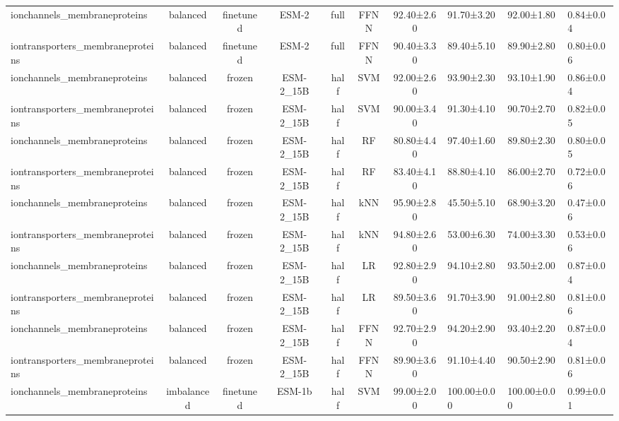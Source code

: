 \begin{tabular}{lcccccc}
    ionchannels\_membraneproteins &   balanced &      finetuned &        ESM-2 &      full &       FFNN &  92.40±2.60 &  91.70±3.20 &  92.00±1.80 & 0.84±0.04 \\
iontransporters\_membraneproteins &   balanced &      finetuned &        ESM-2 &      full &       FFNN &  90.40±3.30 &  89.40±5.10 &  89.90±2.80 & 0.80±0.06 \\
    ionchannels\_membraneproteins &   balanced &         frozen &    ESM-2\_15B &      half &        SVM &  92.00±2.60 &  93.90±2.30 &  93.10±1.90 & 0.86±0.04 \\
iontransporters\_membraneproteins &   balanced &         frozen &    ESM-2\_15B &      half &        SVM &  90.00±3.40 &  91.30±4.10 &  90.70±2.70 & 0.82±0.05 \\
    ionchannels\_membraneproteins &   balanced &         frozen &    ESM-2\_15B &      half &         RF &  80.80±4.40 &  97.40±1.60 &  89.80±2.30 & 0.80±0.05 \\
iontransporters\_membraneproteins &   balanced &         frozen &    ESM-2\_15B &      half &         RF &  83.40±4.10 &  88.80±4.10 &  86.00±2.70 & 0.72±0.06 \\
    ionchannels\_membraneproteins &   balanced &         frozen &    ESM-2\_15B &      half &        kNN &  95.90±2.80 &  45.50±5.10 &  68.90±3.20 & 0.47±0.06 \\
iontransporters\_membraneproteins &   balanced &         frozen &    ESM-2\_15B &      half &        kNN &  94.80±2.60 &  53.00±6.30 &  74.00±3.30 & 0.53±0.06 \\
    ionchannels\_membraneproteins &   balanced &         frozen &    ESM-2\_15B &      half &         LR &  92.80±2.90 &  94.10±2.80 &  93.50±2.00 & 0.87±0.04 \\
iontransporters\_membraneproteins &   balanced &         frozen &    ESM-2\_15B &      half &         LR &  89.50±3.60 &  91.70±3.90 &  91.00±2.80 & 0.81±0.06 \\
    ionchannels\_membraneproteins &   balanced &         frozen &    ESM-2\_15B &      half &       FFNN &  92.70±2.90 &  94.20±2.90 &  93.40±2.20 & 0.87±0.04 \\
iontransporters\_membraneproteins &   balanced &         frozen &    ESM-2\_15B &      half &       FFNN &  89.90±3.60 &  91.10±4.40 &  90.50±2.90 & 0.81±0.06 \\
    ionchannels\_membraneproteins & imbalanced &      finetuned &       ESM-1b &      half &        SVM &  99.00±2.00 & 100.00±0.00 & 100.00±0.00 & 0.99±0.01 \\

\end{tabular}
